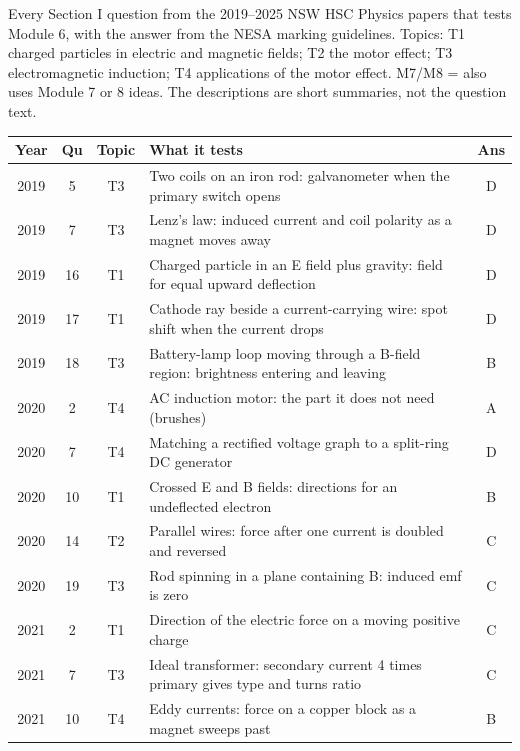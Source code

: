 \documentclass[12pt]{article}
\begin{document}
Every Section I question from the 2019--2025 NSW HSC Physics papers that tests Module 6, with the
answer from the NESA marking guidelines. Topics: T1 charged particles in electric and magnetic fields;
T2 the motor effect; T3 electromagnetic induction; T4 applications of the motor effect. M7/M8 = also uses
Module 7 or 8 ideas. The descriptions are short summaries, not the question text.

{\small\renewcommand{}
\begin{longtable}{|c|c|c|p{108mm}|c|}
  \hline
  \textbf{Year} & \textbf{Qu} & \textbf{Topic} & \textbf{What it tests} & \textbf{Ans}\\ \hline
  \endhead
    2019 & 5 & T3 & Two coils on an iron rod: galvanometer when the primary switch opens & D\\ \hline
    2019 & 7 & T3 & Lenz's law: induced current and coil polarity as a magnet moves away & D\\ \hline
    2019 & 16 & T1 & Charged particle in an E field plus gravity: field for equal upward deflection & D\\ \hline
    2019 & 17 & T1 & Cathode ray beside a current-carrying wire: spot shift when the current drops & D\\ \hline
    2019 & 18 & T3 & Battery-lamp loop moving through a B-field region: brightness entering and leaving & B\\ \hline
    2020 & 2 & T4 & AC induction motor: the part it does not need (brushes) & A\\ \hline
    2020 & 7 & T4 & Matching a rectified voltage graph to a split-ring DC generator & D\\ \hline
    2020 & 10 & T1 & Crossed E and B fields: directions for an undeflected electron & B\\ \hline
    2020 & 14 & T2 & Parallel wires: force after one current is doubled and reversed & C\\ \hline
    2020 & 19 & T3 & Rod spinning in a plane containing B: induced emf is zero & C\\ \hline
    2021 & 2 & T1 & Direction of the electric force on a moving positive charge & C\\ \hline
    2021 & 7 & T3 & Ideal transformer: secondary current 4 times primary gives type and turns ratio & C\\ \hline
    2021 & 10 & T4 & Eddy currents: force on a copper block as a magnet sweeps past & B\\ \hline

\end{longtable}}
\end{document}
